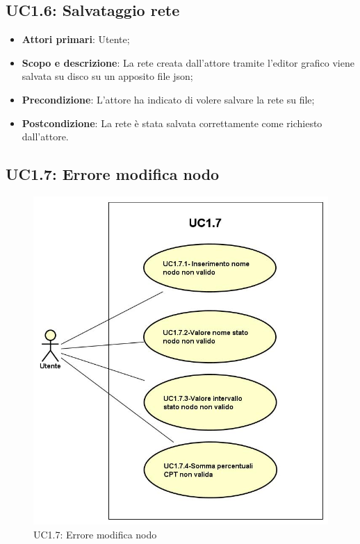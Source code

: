 \subsection{UC1.6: Salvataggio rete} 
\begin{itemize} 
	\item{\textbf{Attori primari}: Utente;} 
	\item{\textbf{Scopo e descrizione}: La rete creata dall'attore tramite l'editor grafico viene salvata su disco su un apposito file json;} 
	\item{\textbf{Precondizione}: L'attore ha indicato di volere salvare la rete su file;} 
	\item{\textbf{Postcondizione}: La rete è stata salvata correttamente come richiesto dall'attore.} 
\end{itemize} 
\subsection{UC1.7: Errore modifica nodo}
\begin{figure} [H]
	\centering
	\includegraphics[scale=0.45]{Img/UC1-7} 
	\caption{UC1.7: Errore modifica nodo} \label{} 
\end{figure}
